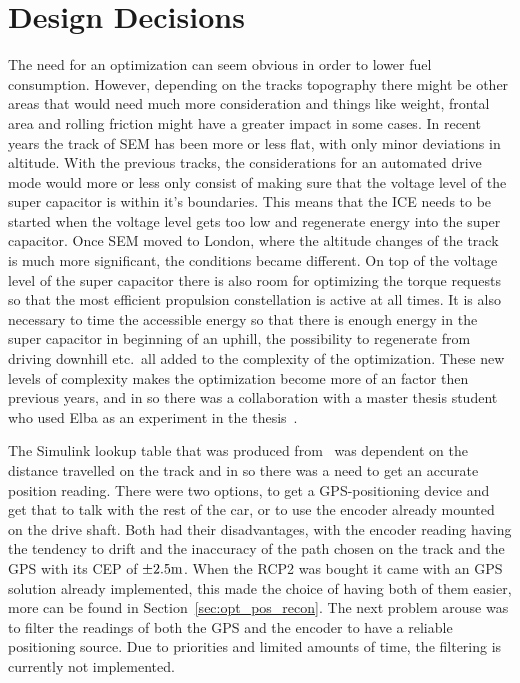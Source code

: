 \section{Design Decisions}
The need for an optimization can seem obvious in order to lower fuel
consumption. However, depending on the tracks topography there might be other
areas that would need much more consideration and things like weight, frontal
area and rolling friction might have a greater impact in some cases. In recent
years the track of SEM has been more or less flat, with only minor deviations
in altitude. With the previous tracks, the considerations for an automated drive mode
would more or less only consist of making sure that the voltage level of the
super capacitor is within it's boundaries. This means that the ICE needs to be
started when the voltage level gets too low and regenerate energy into the super
capacitor. %
Once SEM moved to London, where the altitude changes of
the track is much more significant, the conditions became different. On top of
the voltage level of the super capacitor there is also room for optimizing the
torque requests so that the most efficient propulsion constellation is active at
all times. It is also necessary to time the accessible energy so that there is
enough energy in the super capacitor in beginning of an uphill, the possibility
to regenerate from driving downhill etc.\ all added to the complexity of the
optimization.  These new levels of complexity makes the optimization become more
of an factor then previous years, and in so there was a collaboration with a
master thesis student who used Elba as an experiment in the
thesis~\cite{liu2016}.

The Simulink lookup table that was produced from~\cite{liu2016} was dependent on
the distance travelled on the track and in so there was a need to get an
accurate position reading. There were two options, to get a GPS-positioning
device and get that to talk with the rest of the car, or to use the encoder
already mounted on the drive shaft. Both had their disadvantages, with the
encoder reading having the tendency to drift and the inaccuracy of the path
chosen on the track and the GPS with its CEP of $\pm2.5\textnormal{m}$. When the
RCP2 was bought it came with an GPS solution already implemented, this made the
choice of having both of them easier, more can be found in
Section~\ref{sec:opt_pos_recon}. The next problem arouse was to filter the
readings of both the GPS and the encoder to have a reliable positioning source.
Due to priorities and limited amounts of time, the filtering is currently not implemented. 

